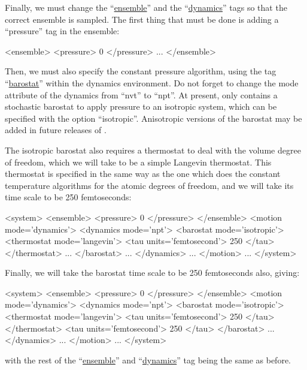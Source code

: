 \documentclass[11pt,english,fleqn]{report}
\newenvironment{code}{%
\footnotesize 
\verbatim
}{
\endverbatim
\normalsize
}
\begin{document}
Finally, we must change the {}``\hyperref[ENSEMBLE]{ensemble}'' 
and the {}``\hyperref[DYNAMICS]{dynamics}'' tags so that the correct
ensemble is sampled. The first thing that must be done is
adding a {}``pressure'' tag in the ensemble:

\begin{code}
<ensemble>
   <pressure> 0 </pressure>
   ...
</ensemble>
\end{code}

Then, we must also specify the constant pressure algorithm,
using the tag {}``\hyperref[BAROSTAT]{barostat}'' within the dynamics
environment. Do not forget to change the mode attribute of the
dynamics from ``nvt'' to ``npt''.
At present, \ipi only contains a stochastic barostat to apply pressure
to an isotropic system, which can be specified with the option ``isotropic''. 
Anisotropic versions of the barostat may be added in future releases of \ipi. 

The isotropic barostat also requires a thermostat
to deal with the volume degree of freedom, which we will take
to be a simple Langevin thermostat.
This thermostat is specified in the same way as the one which does the
constant temperature algorithms for the atomic degrees of freedom, and
we will take its time scale to be 250 femtoseconds:

\begin{code}
<system>
   <ensemble>
      <pressure> 0 </pressure>
   </ensemble>
   <motion mode='dynamics'>
      <dynamics mode='npt'>
         <barostat mode='isotropic'>
            <thermostat mode='langevin'>
               <tau units='femtosecond'> 250 </tau>
            </thermostat>
            ...
         </barostat>
         ...
      </dynamics>
      ...
   </motion>
   ...
</system>
\end{code}

Finally, we will take the barostat time scale to be 250 femtoseconds also, giving:

\begin{code}
<system>
   <ensemble>
      <pressure> 0 </pressure>
   </ensemble>
   <motion mode='dynamics'>
      <dynamics mode='npt'>
         <barostat mode='isotropic'>
            <thermostat mode='langevin'>
               <tau units='femtosecond'> 250 </tau>
            </thermostat>
            <tau units='femtosecond'> 250 </tau>
         </barostat>
         ...
      </dynamics>
      ...
   </motion>
   ...
</system>
\end{code}
with the rest of the {}``\hyperref[ENSEMBLE]{ensemble}'' and
{}``\hyperref[DYNAMICS]{dynamics}'' tag being the same as before.
\end{document}
